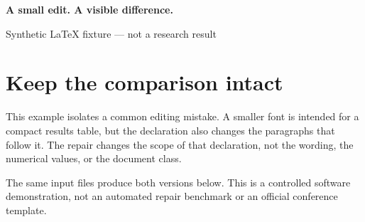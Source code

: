 \begin{center}
{\Large\bfseries A small edit. A visible difference.}\par
\medskip
Synthetic LaTeX fixture --- not a research result
\end{center}
\section{Keep the comparison intact}
This example isolates a common editing mistake. A smaller font is intended for a compact results table, but the declaration also changes the paragraphs that follow it. The repair changes the scope of that declaration, not the wording, the numerical values, or the document class.

The same input files produce both versions below. This is a controlled software demonstration, not an automated repair benchmark or an official conference template.
